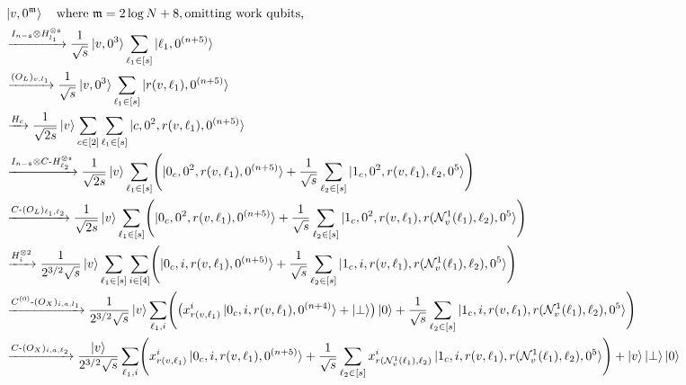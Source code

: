 \documentclass[
  reprint,
  superscriptaddress,
  amsmath,amssymb,
  aps,prl,
]{revtex4-2}
\begin{document}
\begin{align*}
&\ket{v,0^{ \mathfrak m}} \quad \text{where } \mathfrak m = 2\log N +8, \text{omitting work qubits,}%
\\
&\mathrel{\xrightarrow{I_{n-\mathfrak{s}}\otimes H^{\otimes \mathfrak{s}}_{l_1}}} 
\frac{1}{\sqrt{s}} \ket{v,0^{{3}}} \sum_{\ell_1\in[s]} \ket{\ell_1, \zero{(n + 5)}} 
\\
&\mathrel{\xrightarrow{(O_L)_{v,l_1}}} 
\frac{1}{\sqrt{s}} \ket{v,0^{{3}}} \sum_{\ell_1\in[s]} \ket{\rvl, \zero{(n+5)}} 
\\
&\mathrel{\xrightarrow{H_c}} 
\frac{1}{\sqrt{2s}} \ket{v} \sum_{c\in[2]} \sum_{\ell_1\in[s]} \ket{c, 0^{{2}}, \rvl, \zero{(n + 5)}} 
\\
&\mathrel{\xrightarrow{I_{n-\mathfrak{s}}\otimes C\text{-}H^{\otimes \mathfrak{s}}_{\ell_2}}} 
\frac{1}{\sqrt{2s}} \ket{v} \sum_{\ell_1\in[s]} \Biggl( \ket{0_c, 0^{{2}}, \rvl, \zero{(n+5)}} 
+ \frac{1}{\sqrt{s}} \sum_{\ell_2\in[s]} \ket{1_c, 0^{{2}}, \rvl, \ell_2,\zero{5}} \Biggr)
\\
&\mathrel{\xrightarrow{C\text{-}(O_L)_{\ell_1,\ell_2}}} 
\frac{1}{\sqrt{2s}} \ket{v} \sum_{\ell_1\in[s]} \Biggl( \ket{0_c, 0^{{2}}, \rvl, \zero{(n+5)}} 
+ \frac{1}{\sqrt{s}} \sum_{\ell_2\in[s]} \ket{1_c, 0^{{2}}, \rvl, \rrvll,\zero{5}} \Biggr)
\\
&\mathrel{\xrightarrow{H^{\otimes 2}_i}} 
\frac{1}{2^{3/2}\sqrt{s}} \ket{v} \sum_{\ell_1\in[s]} \sum_{i\in[4]} \Biggl( \ket{0_c, i, \rvl, \zero{(n+5)}} 
+ \frac{1}{\sqrt{s}} \sum_{\ell_2\in[s]} \ket{1_c, i, \rvl, \rrvll,\zero{5}} \Biggr)
\\
&\mathrel{\xrightarrow{C^{(0)}\text{-}(O_X)_{i,a,l_1}}} 
\frac{1}{2^{3/2}\sqrt{s}} \ket{v} \sum_{\ell_1,i} \Biggl( \bigl(x_{\rvl}^i\ket{0_c, i, \rvl, \zero{(n+4)}}+\ket{\perp}\bigr)\ket 0 
+ \frac{1}{\sqrt{s}} \sum_{\ell_2\in[s]} \ket{1_c, i, \rvl, \rrvll, \zero{5}} \Biggr)
\\
&\mathrel{\xrightarrow{C\text{-}(O_X)_{i,a,\ell_2}}} 
\frac{\ket{v}}{2^{3/2}\sqrt{s}} \sum_{\ell_1,i} \Biggl( x_{\rvl}^i \ket{0_c, i, \rvl, \zero{(n+5)}} 
+ \frac{1}{\sqrt{s}} \sum_{\ell_2\in[s]} x_{\rrvll}^i \ket{1_c, i, \rvl, \rrvll,\zero{5}} \Biggr)
+ \ket{v} \garbage \ket{0} 
\\

\end{align*}
\end{document}
